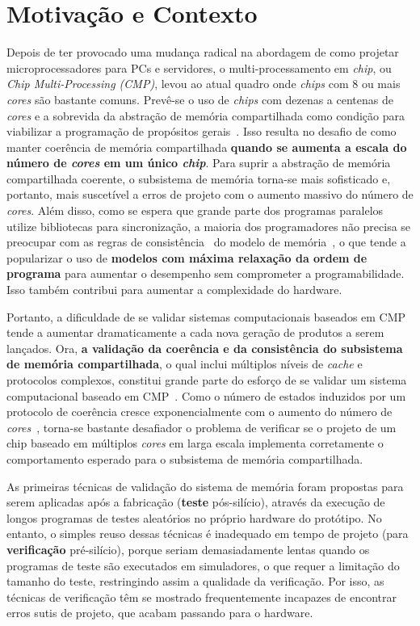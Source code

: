 \section{Motivação e Contexto}

Depois de ter provocado uma mudança radical na abordagem de como projetar
microprocessadores para PCs e servidores, o multi-processamento em
\textit{chip}, ou \textit{Chip Multi-Processing (CMP)}, levou ao atual quadro
onde \textit{chips} com 8 ou mais \textit{cores} são bastante comuns. Prevê-se
o uso de \textit{chips} com dezenas a centenas de \textit{cores} e a sobrevida
da abstração de memória compartilhada como condição para viabilizar a
programação de propósitos gerais~\cite{Devadas:2013}. Isso resulta no desafio
de como manter coerência de memória compartilhada \textbf{quando se aumenta a
escala do número de \textit{cores} em um único \textit{chip}}. Para suprir a
abstração de memória compartilhada coerente, o subsistema de memória torna-se
mais sofisticado e, portanto, mais suscetível a erros de projeto com o aumento
massivo do número de \textit{cores}. Além disso, como se espera que grande
parte dos programas paralelos utilize bibliotecas para sincronização, a maioria
dos programadores não precisa se preocupar com as regras de
consistência~\cite{Adve:1996} do modelo de memória~\cite{Hennessy:2011}, o que
tende a popularizar o uso de \textbf{modelos com máxima relaxação da ordem de
programa} para aumentar o desempenho sem comprometer a programabilidade. Isso
também contribui para aumentar a complexidade do hardware.

Portanto, a dificuldade de se validar sistemas computacionais baseados em CMP
tende a aumentar dramaticamente a cada nova geração de produtos a serem
lançados. Ora, \textbf{a validação da coerência e da consistência do subsistema
de memória compartilhada}, o qual inclui múltiplos níveis de \textit{cache} e
protocolos complexos, constitui grande parte do esforço de se validar um
sistema computacional baseado em CMP~\cite{Wagner:2008}. Como o número de
estados induzidos por um protocolo de coerência cresce exponencialmente com o
aumento do número de \textit{cores}~\cite{Shim:2013}, torna-se bastante
desafiador o problema de verificar se o projeto de um chip baseado em múltiplos
\textit{cores} em larga escala implementa corretamente o comportamento esperado
para o subsistema de memória compartilhada.

As primeiras técnicas de validação do sistema de memória foram propostas para
serem aplicadas após a fabricação (\textbf{teste} pós-silício), através da
execução de longos programas de testes aleatórios no próprio hardware do
protótipo. No entanto, o simples reuso dessas técnicas é inadequado em tempo de
projeto (para \textbf{verificação} pré-silício), porque seriam demasiadamente
lentas quando os programas de teste são executados em simuladores, o que requer
a limitação do tamanho do teste, restringindo assim a qualidade da verificação.
Por isso, as técnicas de verificação têm se mostrado frequentemente incapazes
de encontrar erros sutis de projeto, que acabam passando para o hardware.

